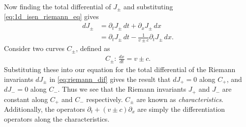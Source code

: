 Now finding the total differential of $J_\pm$ and substituting \ref{eq:1d_isen_riemann_eq} gives
\begin{align}
    d J_\pm &= \partial_t J_\pm \, dt + \partial_x J_\pm \, dx \\
    &= \partial_t J_\pm \, dt - \frac{1}{v \pm c} \partial_t J_\pm \, dx. \label{eq:riemann_dif}
\end{align}
Consider two curves $C_\pm$, defined as 
\begin{align}
    C_\pm: \, \frac{dx}{dt} = v \pm c.
\end{align}
Substituting these into our equation for the total differential of the Riemann invariants $dJ_\pm$ in \ref{eq:riemann_dif} gives the result that $dJ_+ = 0$ along $C_+$, and $dJ_- = 0$ along $C_-$.
Thus we see that the Riemann invariants $J_+$ and $J_-$ are constant along $C_+$ and $C_-$ respectively.
$C_\pm$ are known as \textit{characteristics}.
Additionally, the operators $\partial_t + (v \pm c)\partial_x$ are simply the differentiation operators along the characteristics.